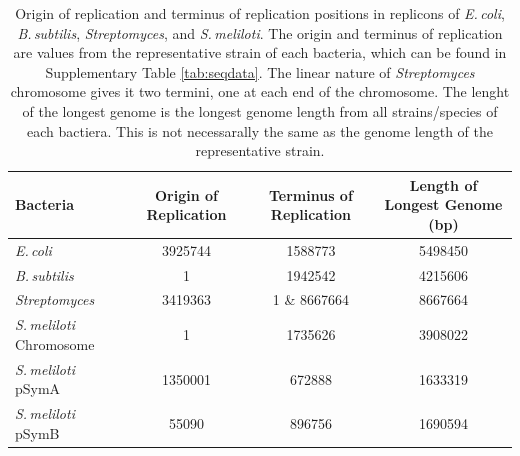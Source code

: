 \documentclass[11pt]{article}
\newcommand{\smel}{\textit{S.\,meliloti}\xspace}
\newcommand{\strep}{\textit{Streptomyces}\xspace}
\newcommand{\ecol}{\textit{E.\,coli}\xspace}
\newcommand{\bass}{\textit{B.\,subtilis}\xspace}
\begin{document}
	\begin{table}[H]
		\begin{center}
			\begin{tabular}{lccc}
				\toprule
				Bacteria & Origin of Replication & Terminus of Replication & Length of Longest Genome (bp)\\
				\midrule
				\ecol & 3925744 & 1588773 & 5498450 \\
				\bass & 1 & 1942542 & 4215606\\
				\strep & 3419363 & 1 \& 8667664 & 8667664\\
				\smel Chromosome & 1 & 1735626 & 3908022\\
				\smel pSymA & 1350001 & 672888 & 1633319\\
				\smel pSymB & 55090 & 896756 & 1690594\\
				\bottomrule
			\end{tabular}
			\caption{\label{tab:oriloc} Origin of replication and terminus of replication positions in replicons of \ecol, \bass, \strep, and \smel. The origin and terminus of replication are values from the representative strain of each bacteria, which can be found in Supplementary Table \ref{tab:seqdata}. The linear nature of \strep chromosome gives it two termini, one at each end of the chromosome. The lenght of the longest genome is the longest genome length from all strains/species of each bactiera. This is not necessarally the same as the genome length of the representative strain.}
		\end{center}
	\end{table}
	
\end{document}
